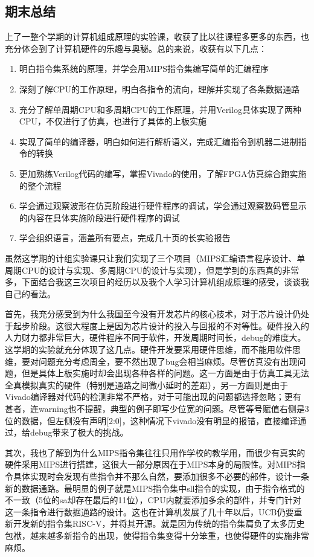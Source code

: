 \documentclass[12pt,UTF8]{ctexart}
\begin{document}
\begin{spacing}{1.1}
\section{期末总结}
\qquad 上了一整个学期的计算机组成原理的实验课，收获了比以往课程多更多的东西，也充分体会到了计算机硬件的乐趣与奥秘。总的来说，收获有以下几点：
\begin{enumerate}
    \item 明白指令集系统的原理，并学会用MIPS指令集编写简单的汇编程序
    \item 深刻了解CPU的工作原理，明白各指令的流向，理解并实现了各条数据通路
    \item 充分了解单周期CPU和多周期CPU的工作原理，并用Verilog具体实现了两种CPU，不仅进行了仿真，也进行了具体的上板实施
    \item 实现了简单的编译器，明白如何进行解析语义，完成汇编指令到机器二进制指令的转换
    \item 更加熟练Verilog代码的编写，掌握Vivado的使用，了解FPGA仿真综合跑实施的整个流程
    \item 学会通过观察波形在仿真阶段进行硬件程序的调试，学会通过观察数码管显示的内容在具体实施阶段进行硬件程序的调试
    \item 学会组织语言，涵盖所有要点，完成几十页的长实验报告
\end{enumerate}
\par 虽然这学期的计组实验课只让我们实现了三个项目（MIPS汇编语言程序设计、单周期CPU的设计与实现、多周期CPU的设计与实现），但是学到的东西真的非常多，下面结合我这三次项目的经历以及我个人学习计算机组成原理的感受，谈谈我自己的看法。
\par 首先，我充分感受到为什么我国至今没有开发芯片的核心技术，对于芯片设计仍处于起步阶段。这很大程度上是因为芯片设计的投入与回报的不对等性。硬件投入的人力财力都非常巨大，硬件程序不同于软件，开发周期时间长，debug的难度大。这学期的实验就充分体现了这几点。硬件开发要采用硬件思维，而不能用软件思维，要对问题充分考虑周全，要不然出现了bug会相当麻烦。尽管仿真没有出现问题，但是具体上板实施时却会出现各种各样的问题。这一方面是由于仿真工具无法全真模拟真实的硬件（特别是通路之间微小延时的差距），另一方面则是由于Vivado编译器对代码的检测非常不严格，对于可能出现的问题都选择忽略；更有甚者，连warning也不提醒，典型的例子即写少位宽的问题。尽管等号赋值右侧是3位的数据，但左侧没有声明[2:0]，这种情况下vivado没有明显的报错，直接编译通过，给debug带来了极大的挑战。
\par 其次，我也了解到为什么MIPS指令集往往只用作学校的教学用，而很少有真实的硬件采用MIPS进行搭建，这很大一部分原因在于MIPS本身的局限性。对MIPS指令具体实现时会发现有些指令并不那么自然，要添加很多不必要的部件，设计一条新的数据通路。最明显的例子就是MIPS指令集中sll指令的实现，由于指令格式的不一致（5位的sa却存在最后的11位），CPU内就要添加多余的部件，并专门针对这一条指令进行数据通路的设计。这也在计算机发展了几十年以后，UCB仍要重新开发新的指令集RISC-V，并将其开源。就是因为传统的指令集肩负了太多历史包袱，越来越多新指令的出现，使得指令集变得十分笨重，也使得硬件的实施非常麻烦。

\end{spacing}
\end{document}
